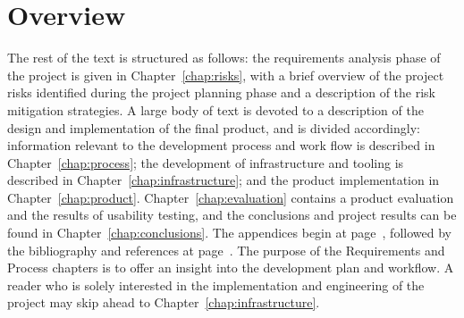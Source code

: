 \section*{Overview}\label{sec:overview}
The rest of the text is structured as follows: the requirements
analysis phase of the project is given in Chapter~\ref{chap:risks},
with a brief overview of the project risks identified during the
project planning phase and a description of the risk mitigation
strategies. A large body of text is devoted to a description of the
design and implementation of the final product, and is divided
accordingly: information relevant to the development process and work
flow is described in Chapter~\ref{chap:process}; the development of
infrastructure and tooling is described in
Chapter~\ref{chap:infrastructure}; and the product implementation in
Chapter~\ref{chap:product}. Chapter~\ref{chap:evaluation} contains a
product evaluation and the results of usability testing, and the
conclusions and project results can be found in
Chapter~\ref{chap:conclusions}. The appendices begin at
page~\pageref{appendices}, followed by the bibliography and references
at page~\pageref{bibliography}. The purpose of the Requirements and
Process chapters is to offer an insight into the development plan and
workflow. A reader who is solely interested in the implementation and
engineering of the project may skip ahead to
Chapter~\ref{chap:infrastructure}.
